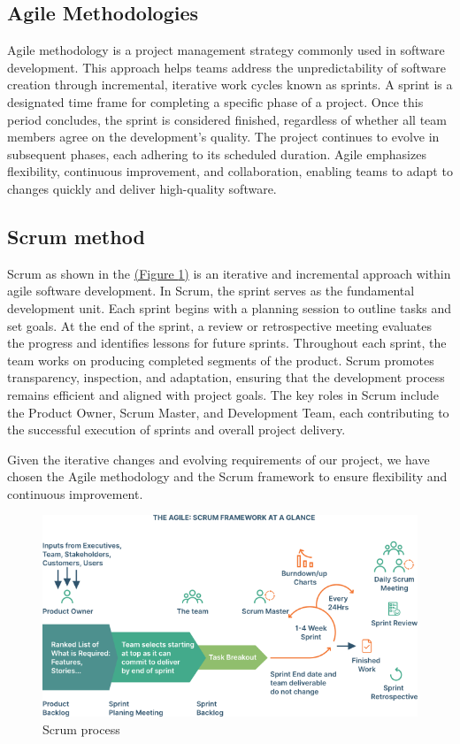 \subsection{Agile Methodologies}
Agile methodology is a project management strategy commonly used in software development. This approach helps teams address the unpredictability of software creation through incremental, iterative work cycles known as sprints. A sprint is a designated time frame for completing a specific phase of a project. Once this period concludes, the sprint is considered finished, regardless of whether all team members agree on the development’s quality. The project continues to evolve in subsequent phases, each adhering to its scheduled duration. Agile emphasizes flexibility, continuous improvement, and collaboration, enabling teams to adapt to changes quickly and deliver high-quality software.
\subsection{Scrum method}
Scrum as shown in the \hyperref[fig:scrum]{(Figure \ref{fig:scrum})} is an iterative and incremental approach within agile software development. In Scrum, the sprint serves as the fundamental development unit. Each sprint begins with a planning session to outline tasks and set goals. At the end of the sprint, a review or retrospective meeting evaluates the progress and identifies lessons for future sprints. Throughout each sprint, the team works on producing completed segments of the product. Scrum promotes transparency, inspection, and adaptation, ensuring that the development process remains efficient and aligned with project goals. The key roles in Scrum include the Product Owner, Scrum Master, and Development Team, each contributing to the successful execution of sprints and overall project delivery.
\vspace{1cm}

Given the iterative changes and evolving requirements of our project, we have chosen the Agile methodology and the Scrum framework to ensure flexibility and continuous improvement.

\vspace{1cm}
\begin{figure}[htbp]
  \centering  %
  \includegraphics[width=13cm]{./chapters/overview/scrum.png}
  \caption{Scrum process}
  \label{fig:scrum}
\end{figure}

